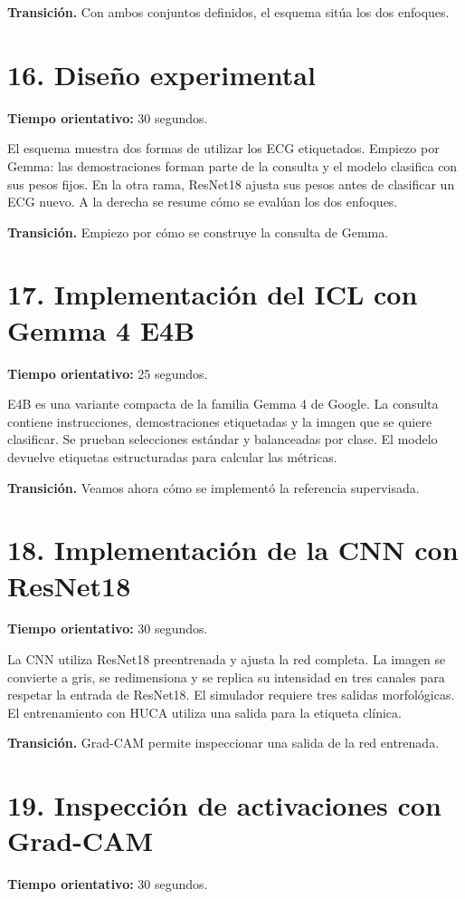 \documentclass[11pt,a4paper]{article}
\begin{document}
\textbf{Transición.} Con ambos conjuntos definidos, el esquema sitúa los dos enfoques.

\section*{16. Diseño experimental}
\textbf{Tiempo orientativo: }30 segundos.

El esquema muestra dos formas de utilizar los ECG etiquetados. Empiezo por Gemma: las demostraciones forman parte de la consulta y el modelo clasifica con sus pesos fijos. En la otra rama, ResNet18 ajusta sus pesos antes de clasificar un ECG nuevo. A la derecha se resume cómo se evalúan los dos enfoques.

\textbf{Transición.} Empiezo por cómo se construye la consulta de Gemma.

\section*{17. Implementación del ICL con Gemma 4 E4B}
\textbf{Tiempo orientativo: }25 segundos.

E4B es una variante compacta de la familia Gemma 4 de Google. La consulta contiene instrucciones, demostraciones etiquetadas y la imagen que se quiere clasificar. Se prueban selecciones estándar y balanceadas por clase. El modelo devuelve etiquetas estructuradas para calcular las métricas.

\textbf{Transición.} Veamos ahora cómo se implementó la referencia supervisada.

\section*{18. Implementación de la CNN con ResNet18}
\textbf{Tiempo orientativo: }30 segundos.

La CNN utiliza ResNet18 preentrenada y ajusta la red completa. La imagen se convierte a gris, se redimensiona y se replica su intensidad en tres canales para respetar la entrada de ResNet18. El simulador requiere tres salidas morfológicas. El entrenamiento con HUCA utiliza una salida para la etiqueta clínica.

\textbf{Transición.} Grad-CAM permite inspeccionar una salida de la red entrenada.

\section*{19. Inspección de activaciones con Grad-CAM}
\textbf{Tiempo orientativo: }30 segundos.
\end{document}

